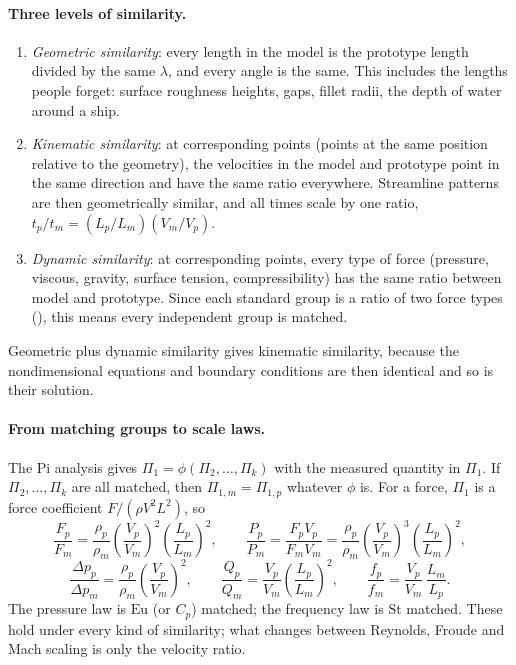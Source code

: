 \paragraph{Three levels of similarity.}
\begin{enumerate}[nosep,leftmargin=*]
\item \emph{Geometric similarity}: every length in the model is the prototype length divided by the same $\lambda$, and every angle is the same. This includes the lengths people forget: surface roughness heights, gaps, fillet radii, the depth of water around a ship.
\item \emph{Kinematic similarity}: at corresponding points (points at the same position relative to the geometry), the velocities in the model and prototype point in the same direction and have the same ratio everywhere. Streamline patterns are then geometrically similar, and all times scale by one ratio, $t_p/t_m = (L_p/L_m)(V_m/V_p)$.
\item \emph{Dynamic similarity}: at corresponding points, every type of force (pressure, viscous, gravity, surface tension, compressibility) has the same ratio between model and prototype. Since each standard group is a ratio of two force types (), this means every independent group is matched.
\end{enumerate}
Geometric plus dynamic similarity gives kinematic similarity, because the nondimensional equations and boundary conditions are then identical and so is their solution.

\paragraph{From matching groups to scale laws.} The Pi analysis gives $\Pi_1 = \phi(\Pi_2, \dots, \Pi_k)$ with the measured quantity in $\Pi_1$. If $\Pi_2, \dots, \Pi_k$ are all matched, then $\Pi_{1,m} = \Pi_{1,p}$ whatever $\phi$ is. For a force, $\Pi_1$ is a force coefficient $F/(\rho V^2L^2)$, so
\[
\frac{F_p}{F_m} = \frac{\rho_p}{\rho_m}\left(\frac{V_p}{V_m}\right)^2\left(\frac{L_p}{L_m}\right)^2, \qquad
\frac{P_p}{P_m} = \frac{F_pV_p}{F_mV_m} = \frac{\rho_p}{\rho_m}\left(\frac{V_p}{V_m}\right)^3\left(\frac{L_p}{L_m}\right)^2,
\]
\[
\frac{\Delta p_p}{\Delta p_m} = \frac{\rho_p}{\rho_m}\left(\frac{V_p}{V_m}\right)^2, \qquad
\frac{Q_p}{Q_m} = \frac{V_p}{V_m}\left(\frac{L_p}{L_m}\right)^2, \qquad
\frac{f_p}{f_m} = \frac{V_p}{V_m}\,\frac{L_m}{L_p}.
\]
The pressure law is $\mathrm{Eu}$ (or $C_p$) matched; the frequency law is $\mathrm{St}$ matched. These hold under every kind of similarity; what changes between Reynolds, Froude and Mach scaling is only the velocity ratio.

